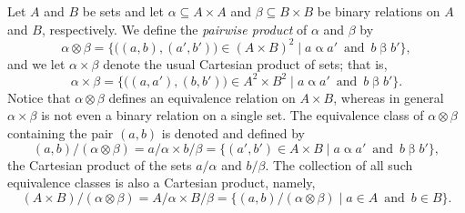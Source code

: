 Let $A$ and $B$ be sets and let $\alpha \subseteq A\times A$ and $\beta \subseteq B\times B$
be binary relations on $A$ and $B$, respectively.
We define
the \emph{pairwise product} of $\alpha$ and $\beta$ by
\begin{equation}
\label{eq:pair-product}
\alpha \otimes \beta = \{\bigl((a, b), (a', b')\bigr) 
\in (A\times B)^2 \mid a\mathrel{\alpha} a'\, \text{ and } \,  b\mathrel{\beta} b'\},
\end{equation}
and we let $\alpha \times \beta$ denote the usual Cartesian product of sets; that is,
\begin{equation}
\label{eq:set-product}
\alpha \times \beta = \{\bigl((a, a'), (b, b')\bigr) 
\in A^2\times B^2 \mid a\mathrel{\alpha} a' \, \text{ and } \, b\mathrel{\beta} b'\}.
\end{equation}
Notice that $\alpha \otimes \beta$ defines an equivalence relation on
$A\times B$, whereas in general $\alpha\times \beta$ is 
not even a binary relation on a single set.
The equivalence class of $\alpha \otimes \beta$ containing the pair
$(a, b)$ is denoted and defined by %
\[(a,b)/(\alpha \otimes \beta) = a/\alpha \times b/\beta= 
    \{(a', b') \in A\times B \mid a\mathrel{\alpha} a' \, \text{ and } \,  b\mathrel{\beta} b'\},
    \]
the Cartesian product of the sets $a/\alpha$ and $b/\beta$.
The collection of all such equivalence classes is also a Cartesian product, namely,
\[
(A\times B)/(\alpha \otimes \beta) =
A/\alpha \times B/\beta  = \{(a, b)/(\alpha \otimes \beta) \mid a\in A \, \text{ and } \, b \in B\}.\]

